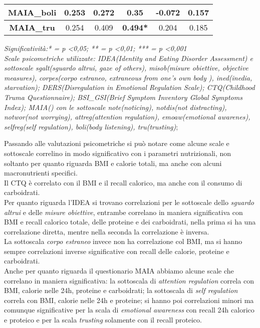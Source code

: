 \documentclass[12pt]{article}
\begin{document}
\begin{table}[H]
{{\begin{tabular}{|c|c|c|c|c|c|}
        \textbf{MAIA\_boli} & 0.253& 0.272& 0.35& -0.072& 0.157\\\hline
        \textbf{MAIA\_tru} & 0.254& 0.409& \textbf{0.494*}& 0.204& 0.185\\\hline
    \end{tabular}%
    }}
    \label{tab:my_label}
    \footnotesize \textit{Significatività:* = p <0,05; ** = p <0,01; *** = p <0,001 \\ Scale psicometriche utilizzate: IDEA(Identity and Eating Disorder Assessment) e sottoscale sgalt(sguardo altrui, gaze of others), misob(misure obiettive, objective measures), corpes(corpo estraneo, extraneous from one's own body ), ined(inedia, starvation); DERS(Disregulation in Emotional Regulation Scale); CTQ(Childhood Truma Questionnaire); BSI\_GSI(Brief Symptom Inventory Global Symptoms Index); MAIA() con le sottoscale note(noticing), notdis(not distracting), notwor(not worrying), attreg(attention regulation), emoaw(emotional awarenes), selfreg(self regulation), boli(body listening), tru(trusting)};
\end{table}

Passando alle valutazioni psicometriche si può notare come alcune scale e sottoscale correlino in modo significativo con i parametri nutrizionali, non soltanto per quanto riguarda BMI e calorie totali, ma anche con alcuni macronutrienti specifici. \\
Il CTQ è correlato con il BMI e il recall calorico, ma anche con il consumo di carboidrati. \\
Per quanto riguarda l'IDEA si trovano correlazioni per le sottoscale dello \emph{sguardo altrui} e delle \emph{misure obiettive}, entrambe correlano in maniera significativa con BMI e recall calorico totale, delle proteine e dei carboidrati, nella prima si ha una correlazione diretta, mentre nella seconda la correlazione è inversa. \\
La sottoscala \emph{corpo estraneo} invece non ha correlazione col BMI, ma si hanno sempre correlazioni inverse significative con recall delle calorie, proteine e carboidrati. \\
Anche per quanto riguarda il questionario MAIA abbiamo alcune scale che correlano in maniera significativa: la sottoscala di \emph{attention regulation} correla con BMI, calorie nelle 24h, proteine e carboidrati; la sottoscala di \emph{self regulation} correla con BMI, calorie nelle 24h e proteine; si hanno poi correlazioni minori ma comunque significative per la scala di \emph{emotional awareness} con recall 24h calorico e proteico e per la scala \emph{trusting} solamente con il recall proteico.
\end{document}
